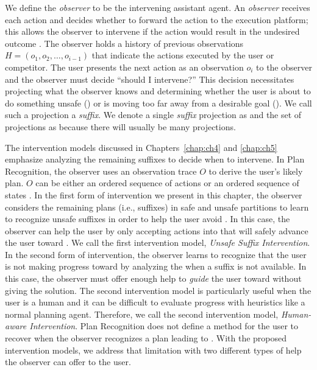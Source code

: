We define the \textit{observer} to be the intervening assistant agent. 
An \textit{observer} receives each action and decides whether to forward the action to the execution platform;
this allows the observer to intervene if the action would result in the undesired outcome \undesired.  
The observer holds a history of previous observations $H = (o_1, o_2, \ldots, o_{i-1})$ that indicate the actions executed by the user or competitor.
The user presents the next action as an observation $o_{i}$ to the observer and the observer must decide ``should I intervene?''
This decision necessitates projecting what the observer knows and determining whether the user is about to do something unsafe (\undesired) 
or is moving too far away from a desirable goal (\desired).
We call such a projection a \textit{suffix}.
We denote a single  \textit{suffix} projection as \Suffix and the set of projections as \Suffixes because there will usually be many projections.

  
The intervention models discussed in Chapters~\ref{chap:ch4} and \ref{chap:ch5} emphasize analyzing the remaining suffixes to decide when to intervene.
In Plan Recognition, the observer uses an observation trace $O$ to derive the user's likely plan. $O$ can be either an ordered sequence of actions  \cite{ramirez2009plan,ramirez2010probabilistic} or an ordered sequence of states \cite{sohrabi2016plan}.
In the first form of intervention we present in this chapter, the observer considers the remaining plans (i.e., suffixes) in safe and unsafe partitions to learn to recognize unsafe suffixes in order to help the user avoid \undesired. 
In this case, the observer can help the user by only accepting actions into \historyDef that will safely advance the user toward \desired.
We call the first intervention model, \textit{Unsafe Suffix Intervention}.
In the second form of intervention, the observer learns to recognize that the user is not making progress toward \desired by analyzing the \historyDef when a suffix is not available. In this case,  the observer must offer enough help to \textit{guide} the user toward \desired without giving the solution. 
The second intervention model is particularly useful when the user is a human and it can be difficult to evaluate progress with heuristics like a normal planning agent.
Therefore, we call the second intervention model, \textit{Human-aware Intervention}.
Plan Recognition does not define a method for the user to recover when the observer recognizes a plan leading to \undesired. 
With the proposed intervention models, we address that limitation with two different types of help the observer can offer to the user.

